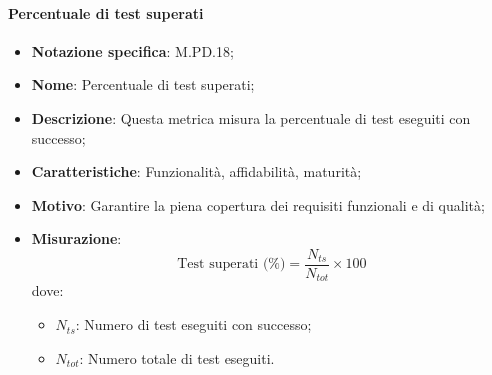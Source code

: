\paragraph*{Percentuale di test superati}
\begin{itemize}
    \item \textbf{Notazione specifica}: M.PD.18;
    \item \textbf{Nome}: Percentuale di test superati;
    \item \textbf{Descrizione}: Questa metrica misura la percentuale di test eseguiti con successo;
    \item \textbf{Caratteristiche}: Funzionalità, affidabilità, maturità;
    \item \textbf{Motivo}: Garantire la piena copertura dei requisiti funzionali e di qualità;
    \item \textbf{Misurazione}:
    \[
    \text{Test superati (\%)} = \frac{N_{ts}}{N_{tot}} \times 100
    \]
    dove:
    \begin{itemize}
        \item $N_{ts}$: Numero di test eseguiti con successo;
        \item $N_{tot}$: Numero totale di test eseguiti.
    \end{itemize}
\end{itemize}
